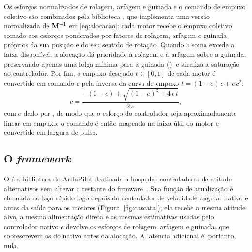 Os esforços normalizados de rolagem, arfagem e guinada e o comando de empuxo
coletivo são combinados pela biblioteca , que
implementa uma versão normalizada de $\mathbf{M}^{-1}$ em
\eqref{eq:alocacao}: cada motor recebe o empuxo coletivo somado aos esforços
ponderados por fatores de rolagem, arfagem e guinada próprios da sua posição e
do seu sentido de rotação. Quando a soma excede a faixa disponível, a
alocação dá prioridade à rolagem e à arfagem sobre a guinada, preservando
apenas uma folga mínima para a guinada (), e
sinaliza a saturação ao controlador. Por fim, o empuxo desejado $t \in [0,1]$
de cada motor é convertido em comando $c$ pela inversa da curva de empuxo
$t = (1-e)\,c + e\,c^2$:
\begin{equation}
c = \frac{-(1-e) + \sqrt{(1-e)^2 + 4\,e\,t}}{2\,e},
\label{eq:linearizacao-empuxo}
\end{equation}
com $e$ dado por , de modo que o esforço do controlador
seja aproximadamente linear em empuxo; o comando é então mapeado na faixa útil
do motor e convertido em largura de pulso.

\subsection{O \textit{framework} \texorpdfstring{}{AC\_CustomControl}}
\label{sec:customcontrol}

O  é a biblioteca do ArduPilot destinada a
hospedar controladores de atitude alternativos sem alterar o restante do
firmware~\cite{ardupilot2026}. Sua função de atualização é chamada no laço
rápido logo depois do controlador de velocidade angular nativo e antes da
saída para os motores (Figura~\ref{fig:cascata}); ela recebe a mesma atitude
alvo, a mesma alimentação direta e as mesmas estimativas usadas pelo
controlador nativo e devolve os esforços de rolagem, arfagem e guinada,
que sobrescrevem os do nativo antes da alocação. A latência adicional é,
portanto, nula.

